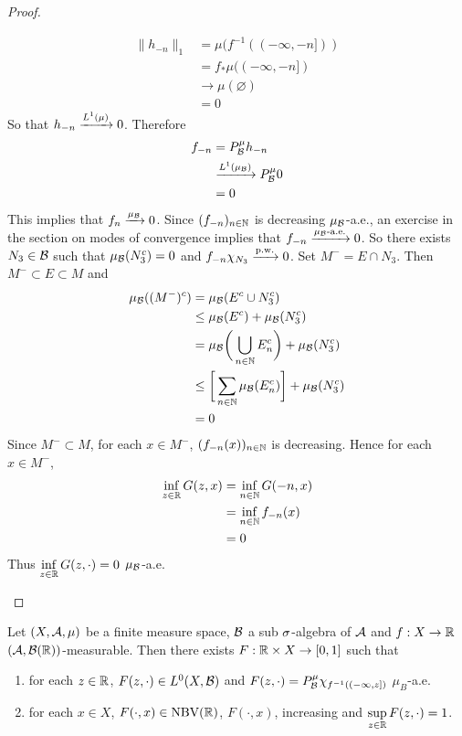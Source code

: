\documentclass{book}
\begin{document}
\begin{proof}
\begin{enumerate}
		\begin{align*}
			\|h_{-n}\|_1
			& = \mu(f^{-1}((-\infty, -n])) \\
			& = f_*\mu((-\infty, -n]) \\
			& \rightarrow \mu(\varnothing) \\
			& = 0 
		\end{align*}
		So that $h_{-n} \xrightarrow{L^1(\mu)} 0$. Therefore  
		\begin{align*}
			f_{-n}
			& = P^{\mu}_{\mathcal{B}} h_{-n} \\
			& \xrightarrow{L^1(\mu_{\mathcal{B}})} P^{\mu}_{\mathcal{B}} 0 \\
			& = 0
		\end{align*}
		This implies that $f_n \xrightarrow{\mu_{\mathcal{B}}} 0$. Since $(f_{-n})_{n \in \mathbb{N}}$ is decreasing $\mu_{\mathcal{B}}$-a.e., an exercise in the section on modes of convergence implies that $f_{-n} \xrightarrow{\text{$\mu_{\mathcal{B}}$-a.e.}} 0$. So there exists $N_3 \in \mathcal{B}$ such that $\mu_{\mathcal{B}}(N_3^c) = 0$ and $f_{-n} \chi_{N_3} \xrightarrow{\text{p.w.}} 0$. Set $M^- = E \cap N_3$. Then $M^- \subset E \subset M$ and
		\begin{align*}
			\mu_{\mathcal{B}}((M^-)^c)
			& = \mu_{\mathcal{B}}(E^c \cup N_3^c) \\ 
			& \leq \mu_{\mathcal{B}}(E^c) + \mu_{\mathcal{B}}(N_3^c) \\
			& = \mu_{\mathcal{B}} \bigg( \bigcup_{n \in \mathbb{N}} E_n^c \bigg) + \mu_{\mathcal{B}}(N_3^c) \\
			& \leq \bigg[\sum\limits_{n \in \mathbb{N}} \mu_{\mathcal{B}}(E_n^c) \bigg] + \mu_{\mathcal{B}}(N_3^c) \\
			& = 0
		\end{align*}
		Since $M^- \subset M$, for each $x \in M^-$, $(f_{-n}(x))_{n \in \mathbb{N}}$ is decreasing. Hence for each $x \in M^-$,
		\begin{align*}
			\inf\limits_{z \in \mathbb{R}} G(z, x) 
			& = \inf\limits_{n \in \mathbb{N}} G(-n, x) \\
			& = \inf\limits_{n \in \mathbb{N}} f_{-n}(x) \\
			& = 0
		\end{align*}
		Thus $\inf\limits_{z \in \mathbb{R}} G(z, \cdot) = 0$ $\mu_{\mathcal{B}}$-a.e.
		\end{enumerate}
	\end{proof}

	\begin{ex}
		Let $(X, \mathcal{A}, \mu)$ be a finite measure space, $\mathcal{B}$ a sub $\sigma$-algebra of $\mathcal{A}$ and $f: X \rightarrow \mathbb{R}$ $(\mathcal{A}, \mathcal{B}(\mathbb{R}))$-measurable. Then there exists $F: \mathbb{R} \times X \rightarrow [0,1]$ such that
		\begin{enumerate}
			\item for each $z \in \mathbb{R}$, $F(z, \cdot) \in L^0(X, \mathcal{B})$ and $F(z, \cdot) = P^{\mu}_{\mathcal{B}}\chi_{f^{-1}((-\infty, z])}$ $\mu_B$-a.e.
			\item for each $x \in X$, $F(\cdot, x) \in \text{NBV}(\mathbb{R})$, $F(\cdot, x)$, increasing and $\sup\limits_{z \in \mathbb{R}} F(z, \cdot) = 1$.
		\end{enumerate}
	\end{ex}
\end{document}
